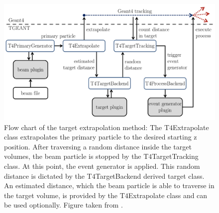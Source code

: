 \begin{figure}[!h]
  \centering
	\includegraphics[scale=0.5]{./gfx/Targetextrap.png}
	\caption{Flow chart of the target extrapolation method: The T$4$Extrapolate class extrapolates the primary particle to the desired starting z position. After traversing a random distance inside the target volumes, the beam particle is stopped by the T$4$TargetTracking class. At this point, the event generator is applied. This random distance is dictated by the T$4$TargetBackend derived target class. An estimated distance, which the beam particle is able to traverse in the target volume, is provided by the T$4$Extrapolate class and can be used optionally. Figure taken from \cite{Tobias}.}
	\label{pic:Targetextrap}
\end{figure}

